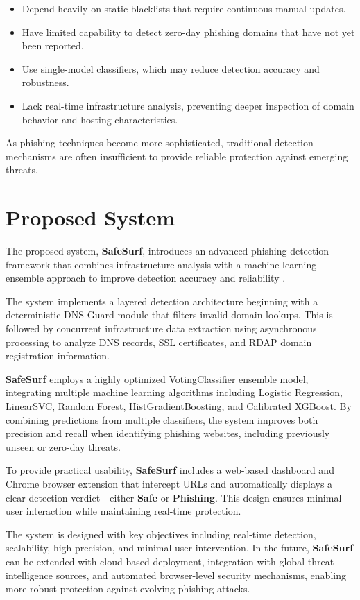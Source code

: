 \begin{itemize}
\item Depend heavily on static blacklists that require continuous manual updates.

\item Have limited capability to detect zero-day phishing domains that have not yet been reported.

\item Use single-model classifiers, which may reduce detection accuracy and robustness.

\item Lack real-time infrastructure analysis, preventing deeper inspection of domain behavior and hosting characteristics.
\end{itemize}

As phishing techniques become more sophisticated, traditional detection mechanisms are often insufficient to provide reliable protection against emerging threats.

\section{Proposed System}

The proposed system, \textbf{SafeSurf}, introduces an advanced phishing detection framework that combines infrastructure analysis with a machine learning ensemble approach to improve detection accuracy and reliability \cite{ref8}.

The system implements a layered detection architecture beginning with a deterministic DNS Guard module that filters invalid domain lookups. This is followed by concurrent infrastructure data extraction using asynchronous processing to analyze DNS records, SSL certificates, and RDAP domain registration information.

\textbf{SafeSurf} employs a highly optimized VotingClassifier ensemble model, integrating multiple machine learning algorithms including Logistic Regression, LinearSVC, Random Forest, HistGradientBoosting, and Calibrated XGBoost. By combining predictions from multiple classifiers, the system improves both precision and recall when identifying phishing websites, including previously unseen or zero-day threats.

To provide practical usability, \textbf{SafeSurf} includes a web-based dashboard and Chrome browser extension that intercept URLs and automatically displays a clear detection verdict---either \textbf{Safe} or \textbf{Phishing}. This design ensures minimal user interaction while maintaining real-time protection.

The system is designed with key objectives including real-time detection, scalability, high precision, and minimal user intervention. In the future, \textbf{SafeSurf} can be extended with cloud-based deployment, integration with global threat intelligence sources, and automated browser-level security mechanisms, enabling more robust protection against evolving phishing attacks.